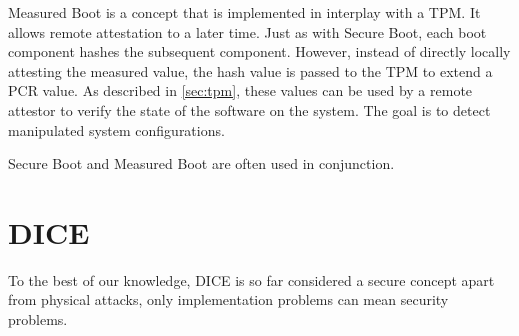 Measured Boot \cite{tcgMeasuredBoot} is a concept that is implemented in interplay with a TPM. It allows remote attestation to a later time. Just as with Secure Boot, each boot component hashes the subsequent component. However, instead of directly locally attesting the measured value, the hash value is passed to the TPM to extend a \ac{PCR} value. As described in \autoref{sec:tpm}, these values can be used by a remote attestor to verify the state of the software on the system. The goal is to detect manipulated system configurations.


Secure Boot and Measured Boot are often used in conjunction.


\section{DICE}

To the best of our knowledge, DICE is so far considered a secure concept apart from physical attacks, only implementation problems can mean security problems.

